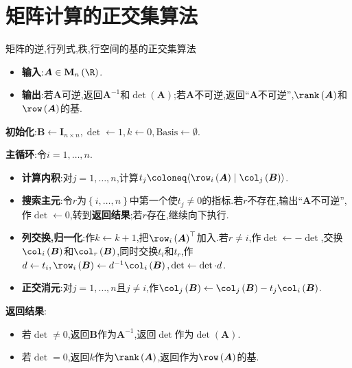 \section{矩阵计算的正交集算法}

\begin{algorithm}{矩阵的逆,行列式,秩,行空间的基的正交集算法}{}
	\begin{itemize}
		\item \textbf{输入}:$\boldsymbol{A}\in\mathbf{M}_{n}\left(\R\right)$.
		\item \textbf{输出}:若$\boldsymbol{A}$可逆,返回$\boldsymbol{A}^{-1}$和$\det\left(\boldsymbol{A}\right)$;若$\boldsymbol{A}$不可逆,返回``$\boldsymbol{A}$不可逆'',$\rank\left(\boldsymbol{A}\right)$和$\row\left(\boldsymbol{A}\right)$的基.
	\end{itemize}
	\textbf{初始化}:$\boldsymbol{B}\leftarrow\boldsymbol{I}_{n\times n},\det\leftarrow 1,k\leftarrow 0,\text{Basis}\leftarrow\emptyset$.
	
	\textbf{主循环}:令$i=1,\ldots,n$.
	\begin{itemize}
		\item \textbf{计算内积}:对$j=1,\ldots,n$,计算$t_{j}\coloneq\langle\row_{i}\left(\boldsymbol{A}\right)\mid\col_{j}\left(\boldsymbol{B}\right)\rangle$.
		\item \textbf{搜索主元}:令$r$为$\left\{i,\ldots,n\right\}$中第一个使$t_{j}\neq 0$的指标.若$r$不存在,输出``$\boldsymbol{A}$不可逆'',作$\det\leftarrow 0$,转到\textbf{返回结果};若$r$存在,继续向下执行.
		\item \textbf{列交换,归一化}:作$k\leftarrow k+1$,把$\row_{i}\left(\boldsymbol{A}\right)^{\top}$加入.若$r\neq i$,作$\det\leftarrow -\det$,交换$\col_{i}\left(\boldsymbol{B}\right)$和$\col_{r}\left(\boldsymbol{B}\right)$,同时交换$t_{i}$和$t_{r}$,作$d\leftarrow t_{i},\row_{i}\left(\boldsymbol{B}\right)\leftarrow d^{-1}\col_{i}\left(\boldsymbol{B}\right),\det\leftarrow\det\cdot d$.
		\item \textbf{正交消元}:对$j=1,\ldots,n$且$j\neq i$,作$\col_{j}\left(\boldsymbol{B}\right)\leftarrow\col_{j}\left(\boldsymbol{B}\right)-t_{j}\col_{i}\left(\boldsymbol{B}\right)$.
	\end{itemize}
	\textbf{返回结果}:
	\begin{itemize}
		\item 若$\det\neq 0$,返回$\boldsymbol{B}$作为$\boldsymbol{A}^{-1}$,返回$\det$作为$\det\left(\boldsymbol{A}\right)$.
		\item 若$\det=0$,返回$k$作为$\rank\left(\boldsymbol{A}\right)$,返回作为$\row\left(\boldsymbol{A}\right)$的基.
	\end{itemize}
\end{algorithm}